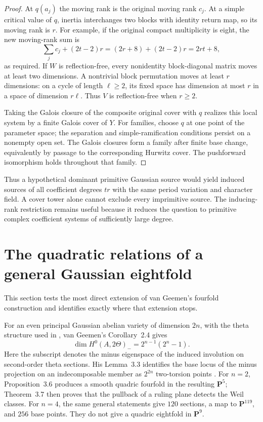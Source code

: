 \documentclass[11pt]{article}
\theoremstyle{definition}
\theoremstyle{remark}
\begin{document}
\begin{proof}
At $q(a_j)$ the moving rank is the original moving rank $c_j$.
At a simple critical value of $q$, inertia interchanges two
blocks with identity return map, so its moving rank is $r$.
For example, if the original compact multiplicity is eight,
the new moving-rank sum is
\[
 \sum_j c_j+(2t-2)r=(2r+8)+(2t-2)r=2rt+8,
\]
as required.  If $W$ is reflection-free, every nonidentity
block-diagonal matrix moves at least two dimensions.  A
nontrivial block permutation moves at least $r$ dimensions:
on a cycle of length $\ell\geq2$, its fixed space has dimension
at most $r$ in a space of dimension $r\ell$.  Thus $V$ is
reflection-free when $r\geq2$.

Taking the Galois closure of the composite original cover with
$q$ realizes this local system by a finite Galois cover of $Y$.
For families, choose $q$ at one point of the parameter space;
the separation and simple-ramification conditions persist on a
nonempty open set.  The Galois closures form a family after
finite base change, equivalently by passage to the corresponding
Hurwitz cover.  The pushforward isomorphism holds throughout
that family.
\end{proof}

Thus a hypothetical dominant primitive Gaussian source would
yield induced sources of all coefficient degrees $tr$ with the
same period variation and character field.  A cover tower alone
cannot exclude every imprimitive source.  The inducing-rank
restriction remains useful because it reduces the question to
primitive complex coefficient systems of sufficiently large
degree.


\section{The quadratic relations of a general Gaussian eightfold}
\label{sec:theta-eightfolds}
This section tests the most direct extension of van Geemen's fourfold construction and identifies exactly where that extension stops.

For an even principal Gaussian abelian variety of dimension $2n$,
with the theta structure used in \cite{vG96}, van Geemen's
Corollary~2.4 gives
\[
 \dim H^0(A,2\Theta)_-=2^{n-1}(2^n-1).
\]
Here the subscript denotes the minus eigenspace of the induced
involution on second-order theta sections.
His Lemma~3.3 identifies the base locus of the minus projection on an indecomposable member as $2^{2n}$ two-torsion points \cite[pp.~621--622]{vG96}. For $n=2$, Proposition~3.6 produces a smooth quadric fourfold in the resulting $\mathbf P^5$; Theorem~3.7 then proves that the pullback of a ruling plane detects the Weil classes. For $n=4$, the same general statements give $120$ sections, a map to $\mathbf P^{119}$, and $256$ base points. They do not give a quadric eightfold in $\mathbf P^9$.
\end{document}
